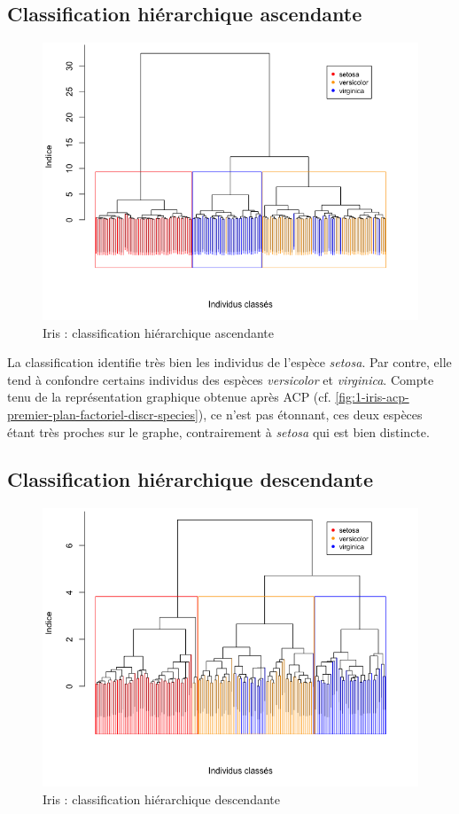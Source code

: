 \documentclass[a4paper,10pt]{report}
\begin{document}
\subsection{Classification hiérarchique ascendante}

\begin{figure}[H]
	\centering
	\captionsetup{justification=centering, margin=3cm}
	\includegraphics[width=.6\linewidth]{img/2-2-1-iris-class-hierarchique-asc}
	\caption{Iris : classification hiérarchique ascendante}
	\label{2-2-1-iris-class-hierarchique-asc}%
\end{figure}

La classification identifie très bien les individus de l'espèce \textit{setosa}. Par contre, elle tend à confondre certains individus des espèces \textit{versicolor} et \textit{virginica}. Compte tenu de la représentation graphique obtenue après ACP (cf. \autoref{fig:1-iris-acp-premier-plan-factoriel-discr-species}), ce n'est pas étonnant, ces deux espèces étant très proches sur le graphe, contrairement à \textit{setosa} qui est bien distincte.


\subsection{Classification hiérarchique descendante}

\begin{figure}[H]
	\centering
	\captionsetup{justification=centering, margin=3cm}
	\includegraphics[width=.6\linewidth]{img/2-2-1-iris-class-hierarchique-desc}
	\caption{Iris : classification hiérarchique descendante}
	\label{2-2-1-iris-class-hierarchique-desc}%
\end{figure}
\end{document}
